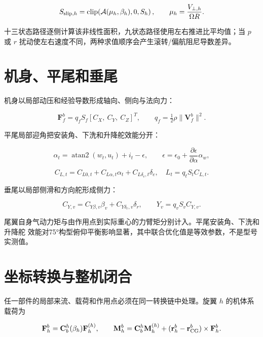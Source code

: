 \documentclass[UTF8,12pt,oneside,openany,fontset=windows]{ctexbook}
\begin{document}
\begin{equation}
S_{{\rm slip},h}=\operatorname{clip}\!\left(\mathcal A(\mu_h,\beta_h),0,S_h\right),
\qquad \mu_h=\frac{V_{\perp,h}}{\Omega R}.
\end{equation}

十三状态路径逐侧计算该非线性面积，九状态路径使用左右推进比平均值；当 \(p\) 或 \(r\) 扰动使左右速度不同，两种求值顺序会产生滚转/偏航阻尼导数差异。

\section{机身、平尾和垂尾}

机身以局部动压和经验导数形成轴向、侧向与法向力：

\begin{equation}
\mathbf F_f^b=q_fS_f[C_X,\ C_Y,\ C_Z]^T,\qquad
q_f=\tfrac12\rho\|\mathbf V_f^b\|^2 .
\end{equation}

平尾局部迎角把安装角、下洗和升降舵效能分开：

\begin{equation}
\alpha_t=\operatorname{atan2}(w_t,u_t)+i_t-\epsilon,\qquad
\epsilon=\epsilon_0+\frac{\partial\epsilon}{\partial\alpha}\alpha_w,
\end{equation}

\begin{equation}
C_{L,t}=C_{L0,t}+C_{L\alpha,t}\alpha_t+C_{L\delta_e,t}\delta_e,
\quad L_t=q_tS_tC_{L,t}.
\end{equation}

垂尾以局部侧滑和方向舵形成侧力：

\begin{equation}
C_{Y,v}=C_{Y\beta,v}\beta_v+C_{Y\delta_r,v}\delta_r,\qquad
Y_v=q_vS_vC_{Y,v}.
\end{equation}

尾翼自身气动力矩与由作用点到实际重心的力臂矩分别计入。平尾安装角、下洗和升降舵 效能对75°构型俯仰平衡影响显著，其中联合优化值是等效参数，不是型号实测值。

\section{坐标转换与整机闭合}

任一部件的局部来流、载荷和作用点必须在同一转换链中处理。旋翼 \(h\) 的机体系载荷为

\begin{equation}
\mathbf F_h^b=\mathbf C_b^h(\beta_h)\mathbf F_h^{(h)},\qquad
\mathbf M_h^b=\mathbf C_b^h\mathbf M_h^{(h)}
+(\mathbf r_h^b-\mathbf r_{\rm CG}^b)\times\mathbf F_h^b.
\end{equation}
\end{document}
